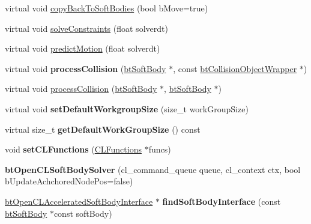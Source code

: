 \begin{DoxyCompactItemize}
virtual void \hyperlink{classbtOpenCLSoftBodySolver_ab5490d39c1bf489ed33d6e6a4582f93b}{copy\+Back\+To\+Soft\+Bodies} (bool b\+Move=true)
\item 
virtual void \hyperlink{classbtOpenCLSoftBodySolver_a24daba36a553aeb1d49158cd804e039a}{solve\+Constraints} (float solverdt)
\item 
virtual void \hyperlink{classbtOpenCLSoftBodySolver_ab48872d1de7b5b960d462c71d36ee92d}{predict\+Motion} (float solverdt)
\item 
\mbox{\label{classbtOpenCLSoftBodySolver_a355451dec750aa4205c9750aa65c1849}} 
virtual void {\bfseries process\+Collision} (\hyperlink{classbtSoftBody}{bt\+Soft\+Body} $\ast$, const \hyperlink{structbtCollisionObjectWrapper}{bt\+Collision\+Object\+Wrapper} $\ast$)
\item 
virtual void \hyperlink{classbtOpenCLSoftBodySolver_a79c0fb52b0e405fec3ea991e2bf8ec29}{process\+Collision} (\hyperlink{classbtSoftBody}{bt\+Soft\+Body} $\ast$, \hyperlink{classbtSoftBody}{bt\+Soft\+Body} $\ast$)
\item 
\mbox{\label{classbtOpenCLSoftBodySolver_af977b199072c53ed3b1fe649257fce95}} 
virtual void {\bfseries set\+Default\+Workgroup\+Size} (size\+\_\+t work\+Group\+Size)
\item 
\mbox{\label{classbtOpenCLSoftBodySolver_afe904e7b8acf17c22db12252035dd8ad}} 
virtual size\+\_\+t {\bfseries get\+Default\+Work\+Group\+Size} () const
\item 
\mbox{\label{classbtOpenCLSoftBodySolver_a121183088db6d037d60602621bf7773f}} 
void {\bfseries set\+C\+L\+Functions} (\hyperlink{classCLFunctions}{C\+L\+Functions} $\ast$funcs)
\item 
\mbox{\label{classbtOpenCLSoftBodySolver_a2f50ffc4b2264bc9017a97dc091ede38}} 
{\bfseries bt\+Open\+C\+L\+Soft\+Body\+Solver} (cl\+\_\+command\+\_\+queue queue, cl\+\_\+context ctx, bool b\+Update\+Achchored\+Node\+Pos=false)
\item 
\mbox{\label{classbtOpenCLSoftBodySolver_ad09f00271255ac5bfb006ffaf40cb567}} 
\hyperlink{classbtOpenCLAcceleratedSoftBodyInterface}{bt\+Open\+C\+L\+Accelerated\+Soft\+Body\+Interface} $\ast$ {\bfseries find\+Soft\+Body\+Interface} (const \hyperlink{classbtSoftBody}{bt\+Soft\+Body} $\ast$const soft\+Body)

\end{DoxyCompactItemize}

